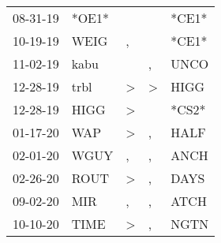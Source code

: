 \begin{supertabular}{p{0.07\textwidth}p{0.06\textwidth}p{0.02\textwidth}p{0.02\textwidth}p{0.06\textwidth}}
          08-31-19\textsuperscript{} &                            *OE1* &                  &                  &                            *CE1* \\
          10-19-19\textsuperscript{} &           WEIG\textsuperscript{} &                , &                  &                            *CE1* \\
          11-02-19\textsuperscript{} &           kabu\textsuperscript{} &                  &                , &           UNCO\textsuperscript{} \\
          12-28-19\textsuperscript{} &           trbl\textsuperscript{} &     \textgreater &     \textgreater &           HIGG\textsuperscript{} \\
          12-28-19\textsuperscript{} &           HIGG\textsuperscript{} &     \textgreater &                  &                            *CS2* \\
          01-17-20\textsuperscript{} &            WAP\textsuperscript{} &     \textgreater &                , &           HALF\textsuperscript{} \\
          02-01-20\textsuperscript{} &           WGUY\textsuperscript{} &                , &                , &           ANCH\textsuperscript{} \\
          02-26-20\textsuperscript{} &           ROUT\textsuperscript{} &     \textgreater &                , &           DAYS\textsuperscript{} \\
          09-02-20\textsuperscript{} &            MIR\textsuperscript{} &                , &                , &           ATCH\textsuperscript{} \\
          10-10-20\textsuperscript{} &           TIME\textsuperscript{} &     \textgreater &                , &           NGTN\textsuperscript{} \\
\end{supertabular}
